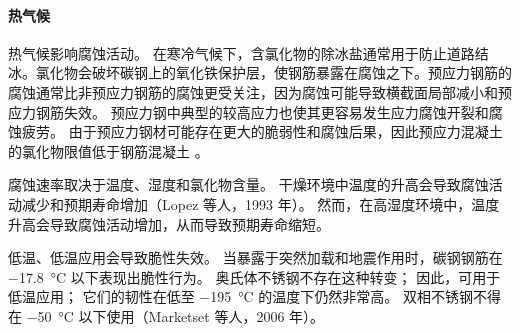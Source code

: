 \paragraph{热气候}
热气候影响腐蚀活动。 在寒冷气候下，含氯化物的除冰盐通常用于防止道路结冰。氯化物会破坏碳钢上的氧化铁保护层，使钢筋暴露在腐蚀之下。预应力钢筋的腐蚀通常比非预应力钢筋的腐蚀更受关注，因为腐蚀可能导致横截面局部减小和预应力钢筋失效\cite{aci2001p}。 预应力钢中典型的较高应力也使其更容易发生应力腐蚀开裂和腐蚀疲劳。 由于预应力钢材可能存在更大的脆弱性和腐蚀后果，因此预应力混凝土的氯化物限值低于钢筋混凝土 \cite{aci2001p}。

腐蚀速率取决于温度、湿度和氯化物含量。 干燥环境中温度的升高会导致腐蚀活动减少和预期寿命增加（Lopez 等人，1993 年）。 然而，在高湿度环境中，温度升高会导致腐蚀活动增加，从而导致预期寿命缩短。

低温、低温应用会导致脆性失效。 当暴露于突然加载和地震作用时，碳钢钢筋在 \qty{-17.8}{\celsius} 以下表现出脆性行为。 奥氏体不锈钢不存在这种转变； 因此，可用于低温应用； 它们的韧性在低至 \qty{-195}{\celsius} 的温度下仍然非常高。 双相不锈钢不得在 \qty{-50}{\celsius} 以下使用（Marketset 等人，2006 年）。

